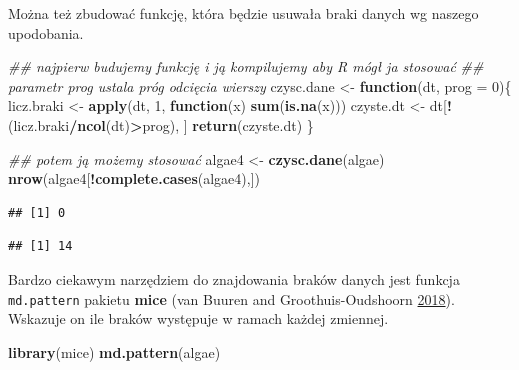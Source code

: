 \documentclass[]{book}
\newenvironment{Shaded}{\begin{snugshade}}{\end{snugshade}}
\newcommand{\CommentTok}[1]{\textcolor[rgb]{0.56,0.35,0.01}{\textit{#1}}}
\newcommand{\ControlFlowTok}[1]{\textcolor[rgb]{0.13,0.29,0.53}{\textbf{#1}}}
\newcommand{\DataTypeTok}[1]{\textcolor[rgb]{0.13,0.29,0.53}{#1}}
\newcommand{\DecValTok}[1]{\textcolor[rgb]{0.00,0.00,0.81}{#1}}
\newcommand{\FloatTok}[1]{\textcolor[rgb]{0.00,0.00,0.81}{#1}}
\newcommand{\KeywordTok}[1]{\textcolor[rgb]{0.13,0.29,0.53}{\textbf{#1}}}
\newcommand{\NormalTok}[1]{#1}
\newcommand{\OperatorTok}[1]{\textcolor[rgb]{0.81,0.36,0.00}{\textbf{#1}}}
\newcommand{\StringTok}[1]{\textcolor[rgb]{0.31,0.60,0.02}{#1}}
\theoremstyle{plain}
\theoremstyle{definition}
\theoremstyle{definition}
\theoremstyle{definition}
\theoremstyle{definition}
\theoremstyle{remark}
\begin{document}
Można też zbudować funkcję, która będzie usuwała braki danych wg naszego upodobania.

\begin{Shaded}
\begin{Highlighting}[]
\CommentTok{## najpierw budujemy funkcję i ją kompilujemy aby R mógł ja stosować}
\CommentTok{## parametr prog ustala próg odcięcia wierszy}
\NormalTok{czysc.dane <-}\StringTok{ }\ControlFlowTok{function}\NormalTok{(dt, }\DataTypeTok{prog =} \DecValTok{0}\NormalTok{)\{}
\NormalTok{    licz.braki <-}\StringTok{ }\KeywordTok{apply}\NormalTok{(dt, }\DecValTok{1}\NormalTok{, }\ControlFlowTok{function}\NormalTok{(x) }\KeywordTok{sum}\NormalTok{(}\KeywordTok{is.na}\NormalTok{(x)))}
\NormalTok{    czyste.dt <-}\StringTok{ }\NormalTok{dt[}\OperatorTok{!}\NormalTok{(licz.braki}\OperatorTok{/}\KeywordTok{ncol}\NormalTok{(dt)}\OperatorTok{>}\NormalTok{prog), ]}
    \KeywordTok{return}\NormalTok{(czyste.dt)}
\NormalTok{\}}
    
\CommentTok{## potem ją możemy stosować}
\NormalTok{algae4 <-}\StringTok{ }\KeywordTok{czysc.dane}\NormalTok{(algae)}
\KeywordTok{nrow}\NormalTok{(algae4[}\OperatorTok{!}\KeywordTok{complete.cases}\NormalTok{(algae4),])}
\end{Highlighting}
\end{Shaded}

\begin{verbatim}
## [1] 0
\end{verbatim}

\begin{Shaded}
\end{Shaded}

\begin{verbatim}
## [1] 14
\end{verbatim}

Bardzo ciekawym narzędziem do znajdowania braków danych jest funkcja \texttt{md.pattern} pakietu \textbf{mice} (van Buuren and Groothuis-Oudshoorn \protect\hyperlink{ref-R-mice}{2018}). Wskazuje on ile braków występuje w ramach każdej zmiennej.

\begin{Shaded}
\begin{Highlighting}[]
\KeywordTok{library}\NormalTok{(mice)}
\KeywordTok{md.pattern}\NormalTok{(algae)}
\end{Highlighting}
\end{Shaded}
\end{document}

